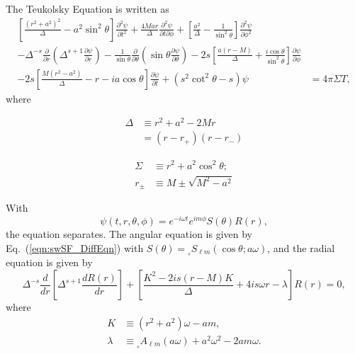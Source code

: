 \documentclass[11pt]{article}
\newcommand{\swS}[5][]{{}_{{}_{#2}}S^{#1}_{#3}(#4;#5)}
\newcommand{\scA}[4][]{{}_{{}_{#2}}A^{#1}_{#3}(#4)}
\begin{document}
\newpage
{}
\vspace{0.25in}

The Teukolsky Equation is written as
\begin{equation}
\begin{aligned}
\left[\frac{(r^2+a^2)^2}{\Delta} - a^2\sin^2\theta\right]
   \frac{\partial^2\psi}{\partial{t}^2}
+ \frac{4Mar}{\Delta}\frac{\partial^2\psi}{\partial{t}\partial\phi}
+ \left[\frac{a^2}{\Delta} - \frac1{\sin^2\theta}\right]
   \frac{\partial^2\psi}{\partial\phi^2} &\\
- \Delta^{-s}\frac{\partial}{\partial{r}}\left(
    \Delta^{s+1}\frac{\partial\psi}{\partial{r}}\right)
-  \frac1{\sin\theta}\frac{\partial}{\partial\theta}\left(
   \sin\theta\frac{\partial\psi}{\partial\theta}\right)
- 2s\left[\frac{a(r-M)}{\Delta} + \frac{i\cos\theta}{\sin^2\theta}\right]
     \frac{\partial\psi}{\partial\phi} &\\
- 2s\left[\frac{M(r^2-a^2)}{\Delta} - r - ia\cos\theta\right]
     \frac{\partial\psi}{\partial{t}}
+ (s^2\cot^2\theta - s)\psi
&= 4\pi\Sigma T,
\end{aligned}
\end{equation}
where\\
\parbox{3.75in}{
\begin{align}
  \Delta &\equiv r^2 + a^2 - 2Mr \nonumber \\
         &= (r-r_+)(r-r_\minus)
\end{align}
}
\parbox{3.75in}{
\begin{align}
  \Sigma &\equiv r^2 + a^2\cos^2\theta; \\
    r_\pm &\equiv M \pm \sqrt{M^2 - a^2}
\end{align}
}

With
\begin{equation}
  \psi(t,r,\theta,\phi) = e^{-i\omega{t}} e^{im\phi}S(\theta)R(r),
\end{equation}
the equation separates.  The angular equation is given by
Eq.~(\ref{eqn:swSF_DiffEqn}) with $S(\theta) =
\swS{s}{\ell{m}}{\cos\theta}{a\omega}$, and the radial equation
is given by
\begin{equation}\label{eqn:radialR:Diff_Eqn}
\Delta^{-s}\frac{d}{dr}\left[\Delta^{s+1}\frac{dR(r)}{dr}\right]
+ \left[\frac{K^2 -2is(r-M)K}{\Delta} + 4is\omega{r} - \lambda\right]R(r)=0,
\end{equation}
where
\begin{align}
  K &\equiv (r^2+a^2)\omega - am, \\
  \lambda &\equiv \scA{s}{\ell{m}}{a\omega} + a^2\omega^2 - 2am\omega.
\end{align}
\end{document}
